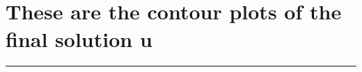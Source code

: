 \documentclass[11pt]{article}
\begin{document}
    \begin{center}
    \end{center}
    { \hspace*{\fill} \\}
    
    \begin{center}
    \end{center}
    { \hspace*{\fill} \\}
    
    \hypertarget{these-are-the-contour-plots-of-the-final-solution-u}{%
\section{These are the contour plots of the final solution
u}\label{these-are-the-contour-plots-of-the-final-solution-u}}

    \begin{center}\rule{0.5\linewidth}{0.5pt}\end{center}


    
    
    
\end{document}
